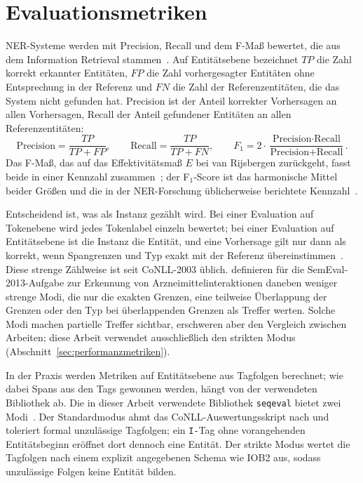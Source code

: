 \section{Evaluationsmetriken}
\label{sec:evaluation}

NER-Systeme werden mit Precision, Recall und dem F-Maß bewertet, die
aus dem Information Retrieval
stammen~\cite{vanrijsbergen1979information,manning2008introduction}.
Auf Entitätsebene bezeichnet $TP$ die Zahl korrekt erkannter Entitäten,
$FP$ die Zahl vorhergesagter Entitäten ohne Entsprechung in der Referenz
und $FN$ die Zahl der Referenzentitäten, die das System nicht gefunden
hat.
Precision ist der Anteil korrekter Vorhersagen an allen Vorhersagen,
Recall der Anteil gefundener Entitäten an allen Referenzentitäten:
\begin{equation}
  \text{Precision} = \frac{TP}{TP + FP}, \qquad
  \text{Recall}    = \frac{TP}{TP + FN}, \qquad
  F_1 = 2 \cdot \frac{\text{Precision} \cdot \text{Recall}}%
                      {\text{Precision} + \text{Recall}} .
  \label{eq:prf1}
\end{equation}
Das F-Maß, das auf das Effektivitätsmaß $E$ bei van Rijsbergen
zurückgeht, fasst beide in einer Kennzahl
zusammen~\cite{vanrijsbergen1979information,manning2008introduction}; der F$_1$-Score ist das
harmonische Mittel beider Größen und die in der NER-Forschung
üblicherweise berichtete Kennzahl~\cite{sang2003conll,keraghel2024recent}.

Entscheidend ist, was als Instanz gezählt wird.
Bei einer Evaluation auf Tokenebene wird jedes Tokenlabel einzeln
bewertet; bei einer Evaluation auf Entitätsebene ist die Instanz die Entität, und eine
Vorhersage gilt nur dann als korrekt, wenn Spangrenzen und Typ exakt
mit der Referenz übereinstimmen~\cite{sang2003conll}.
Diese strenge Zählweise ist seit CoNLL-2003 üblich.
\textcite{segura2013semeval} definieren für die SemEval-2013-Aufgabe zur
Erkennung von Arzneimittelinteraktionen daneben weniger strenge Modi, die
nur die exakten Grenzen, eine teilweise Überlappung der Grenzen oder den
Typ bei überlappenden Grenzen als Treffer werten.
Solche Modi machen partielle Treffer sichtbar, erschweren aber den
Vergleich zwischen Arbeiten; diese Arbeit verwendet ausschließlich den
strikten Modus (Abschnitt~\ref{sec:performanzmetriken}).

In der Praxis werden Metriken auf Entitätsebene aus Tagfolgen berechnet;
wie dabei Spans aus den Tags gewonnen werden, hängt von der verwendeten
Bibliothek ab.
Die in dieser Arbeit verwendete Bibliothek \texttt{seqeval} bietet zwei
Modi~\cite{nakayama2018seqeval}.
Der Standardmodus ahmt das CoNLL-Auswertungsskript nach und toleriert formal unzulässige Tagfolgen; ein
\texttt{I-}Tag ohne vorangehenden Entitätsbeginn eröffnet dort dennoch
eine Entität.
Der strikte Modus wertet die Tagfolgen nach einem explizit angegebenen
Schema wie IOB2 aus, sodass unzulässige Folgen keine Entität bilden.

